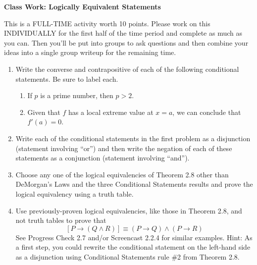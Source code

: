 \documentclass[11pt]{article}
\begin{document}
	
	\thispagestyle{empty}
	\renewcommand{\headrulewidth}{0.0pt}
	\thispagestyle{fancy}
	\lfoot{}
	\cfoot{}
	\rfoot{}	
	
	\vspace*{0in}

		\begin{center}
			\begin{large}
			\textbf{Class Work: Logically Equivalent Statements} \\
			\end{large}
		\end{center}
		
This is a FULL-TIME activity worth 10 points. Please work on this INDIVIDUALLY for the first half of the time period and complete as much as you can. Then you'll be put into groups to ask questions and then combine your ideas into a single group writeup for the remaining time. 

\begin{enumerate}
	\item Write the converse and contrapositive of each of the following conditional statements. Be sure to label each.  
	\begin{enumerate}
		\item If $p$ is a prime number, then $p > 2$. 
		\item Given that $f$ has a local extreme value at $x = a$, we can conclude that $f'(a) = 0$. 
	\end{enumerate}
	
	\item Write each of the conditional statements in the first problem as a disjunction (statement involving ``or'') and then write the negation of each of these statements as a conjunction (statement involving ``and''). 
	
	
	\item Choose any one of the logical equivalencies of Theorem 2.8 other than DeMorgan's Laws and the three Conditional Statements results and prove the logical equivalency using a truth table. 
	
	\item Use previously-proven logical equivalencies, like those in Theorem 2.8, and not truth tables to prove that 
	\[ [P \rightarrow (Q \wedge R) ] \equiv (P \rightarrow Q) \wedge (P \rightarrow R) \]
	See Progress Check 2.7 and/or Screencast 2.2.4 for similar examples. Hint: As a first step, you could rewrite the conditional statement on the left-hand side as a disjunction using Conditional Statements rule \#2 from Theorem 2.8. 
	
\end{enumerate}	
	
\end{document}
